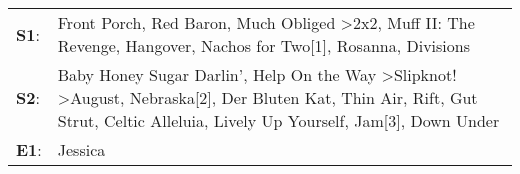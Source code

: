 \begin{supertabular}{p{0.03\textwidth}p{0.92\textwidth}}
 \textbf{S1}:  &                                                                                                                                                                                       Front Porch\textsuperscript{}, \enspace Red Baron\textsuperscript{}, \enspace Much Obliged\textsuperscript{} \textgreater \enspace 2x2\textsuperscript{}, \enspace Muff II: The Revenge\textsuperscript{}, \enspace Hangover\textsuperscript{}, \enspace Nachos for Two[1]\textsuperscript{}, \enspace Rosanna\textsuperscript{}, \enspace Divisions\textsuperscript{}  \enspace  \\
 \textbf{S2}:  &  Baby Honey Sugar Darlin'\textsuperscript{}, \enspace Help On the Way\textsuperscript{} \textgreater \enspace Slipknot!\textsuperscript{} \textgreater \enspace August\textsuperscript{}, \enspace Nebraska[2]\textsuperscript{}, \enspace Der Bluten Kat\textsuperscript{}, \enspace Thin Air\textsuperscript{}, \enspace Rift\textsuperscript{}, \enspace Gut Strut\textsuperscript{}, \enspace Celtic Alleluia\textsuperscript{}, \enspace Lively Up Yourself\textsuperscript{}, \enspace Jam[3]\textsuperscript{}, \enspace Down Under\textsuperscript{}  \enspace  \\
 \textbf{E1}:  &                                                                                                                                                                                                                                                                                                                                                                                                                                                                                                                                    Jessica\textsuperscript{}  \enspace  \\
\end{supertabular}

